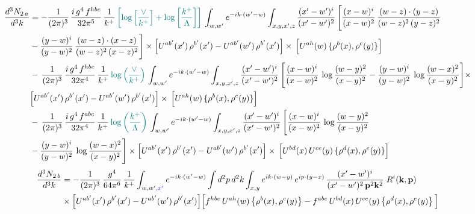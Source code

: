 \documentclass[9pt]{article}
\numberwithin{equation}{section}
\begin{document}
\begin{align}
    \frac{d^{3}N_{2\,a}}{d^{3}k} & = -\frac{1}{(2\pi)^{3}}\,\frac{i\,g^{4}\,f^{hbc}}{32\pi^{5}}\,\frac{1}{k^{+}}\,{\color{teal}\left[\log{\left[\frac{\vee}{k^{+}}\right]}+\log{\left[\frac{k^{+}}{\Lambda}\right]}\right]}\,
\int_{w,w'} e^{-ik\cdot(w'-w)}\int_{x,y,x',z}\frac{(x'-w')^{i}}{(x'-w')^{2}}\,\Bigg[\frac{(x-w)^{i}}{(x-w)^{2}}\, \frac{(w-z)\cdot (y-z)}{(w-z)^{2}\,(y-z)^{2}}\notag \\ & - \frac{(y-w)^{i}}{(y-w)^{2}}\, \frac{(w-z)\cdot (x-z)}{(w-z)^{2}\,(x-z)^{2}}\Bigg]\times\Big[U^{ab'}(x')\,\rho^{b'}(x')-U^{ab'}(w')\,\rho^{b'}(x')\Big]\times\, \Big[U^{ah}(w)\,\{\rho^{b}(x),\rho^{c}(y)\}\Big]\notag \\ & -\,\frac{1}{(2\pi)^{3}}\,\frac{i\,g^{4}\,f^{hbc}}{32\pi^{4}}\,\frac{1}{k^{+}}\,{\color{teal}\log\left(\frac{\vee}{k^{+}}\right)}\,
\int_{w,w'} e^{-ik\cdot(w'-w)}\int_{x,y,x',z}\frac{(x'-w')^{i}}{(x'-w')^{2}}\,\Bigg[\frac{(x-w)^{i}}{(x-w)^{2}}\,\log\frac{(w-y)^{2}}{(x-y)^{2}}-\frac{(y-w)^{i}}{(y-w)^{2}}\,\log\frac{(w-x)^{2}}{(x-y)^{2}}\Bigg]\times\notag \\ & \Big[U^{ab'}(x')\,\rho^{b'}(x')-U^{ab'}(w')\,\rho^{b'}(x')\Big]\times\, \Big[U^{ah}(w)\,\{\rho^{b}(x),\rho^{c}(y)\}\Big]\notag \\ & -\,\frac{1}{(2\pi)^{3}}\,\frac{i\,g^{4}\,f^{abc}}{32\pi^{4}}\,\frac{1}{k^{+}}\,{\color{teal}\log\left(\frac{k^{+}}{\Lambda}\right)}\,
\int_{w,w'} e^{-ik\cdot(w'-w)}\int_{x,y,x',z}\frac{(x'-w')^{i}}{(x'-w')^{2}}\,\Bigg[\frac{(x-w)^{i}}{(x-w)^{2}}\,\log\frac{(w-y)^{2}}{(x-y)^{2}}\notag \\ & -\frac{(y-w)^{i}}{(y-w)^{2}}\,\log\frac{(w-x)^{2}}{(x-y)^{2}}\Bigg]\times \Big[U^{ab'}(x')\,\rho^{b'}(x')-U^{ab'}(w')\,\rho^{b'}(x')\Big]\times\, \Big[U^{bd}(x)\,U^{ce}(y)\,\{\rho^{d}(x),\rho^{e}(y)\}\Big]
\end{align}
\begin{align}
\frac{d^{3}N_{2\,b}}{d^{3}k} & = -\frac{1}{(2\pi)^{3}}\,\frac{g^{4}}{64\pi^{6}}\,\frac{1}{k^{+}}\int_{w,w'{\color{blue},x'}} e^{-ik\cdot(w'-w)}
\int d^{2}p\,d^{2}k\int_{x,y} e^{ik\cdot(w-y)}\,e^{ip\cdot(y-x)}\,\frac{(x'-w')^{i}}{(x'-w')^{2}\,\mathbf{p}^{2}\mathbf{k}^{2}}\;R^{i}(\mathbf{k},\mathbf{p})\notag\\
&\times\Big[U^{ab'}(x')\,\rho^{b'}(x')-U^{ab'}(w')\,\rho^{b'}(x')\Big]
\Big[f^{hbc}\,U^{ah}(w)\left\{\rho^{b}(x),\rho^{c}(y)\right\}-f^{abc}\,U^{bd}(x)\,U^{ce}(y)\left\{\rho^{d}(x),\rho^{e}(y)\right\}\Big]
\end{align}
\end{document}
